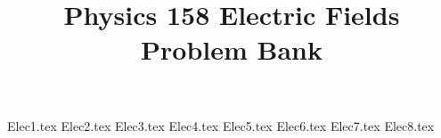 \documentclass[11pt, fleqn]{article}
\title{Physics 158 Electric Fields Problem Bank}
\author{}
\date{}
\begin{document}
\allowdisplaybreaks
\pgfplotsset{compat=1.18}

\maketitle

{Elec1.tex}
{Elec2.tex}
{Elec3.tex}
{Elec4.tex}
{Elec5.tex}
{Elec6.tex}
{Elec7.tex}
{Elec8.tex}
\end{document}
